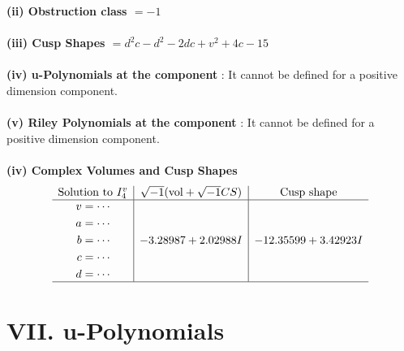 \documentclass[1p]{elsarticle_modified}
\theoremstyle{definition}
\newcommand{\I}{\sqrt{-1}}
\begin{document}
\flushleft \textbf{(ii) Obstruction class $= -1$}\\~\\
\flushleft \textbf{(iii) Cusp Shapes $= d^2 c- d^2-2 d c+v^2+4 c-15$}\\~\\
\flushleft \textbf{(iv) u-Polynomials at the component} : It cannot be defined for a positive dimension component.\\~\\
\flushleft \textbf{(v) Riley Polynomials at the component} : It cannot be defined for a positive dimension component.\\~\\
\newpage\flushleft \textbf{(iv) Complex Volumes and Cusp Shapes}
$$\begin{array}{c|c|c} 
\text{Solution to }I^v_{4}& \I (\text{vol} + \sqrt{-1}CS) & \text{Cusp shape}\\
 \hline 
\begin{aligned}
v &= \cdots \\
a &= \cdots \\
b &= \cdots \\
c &= \cdots \\
d &= \cdots\end{aligned}
 & -3.28987 + 2.02988 I & -12.35599 + 3.42923 I\\
 \hline 
 \end{array}
$$
\newpage\renewcommand{\arraystretch}{1}
\centering \section*{ VII. u-Polynomials}
\end{document}
